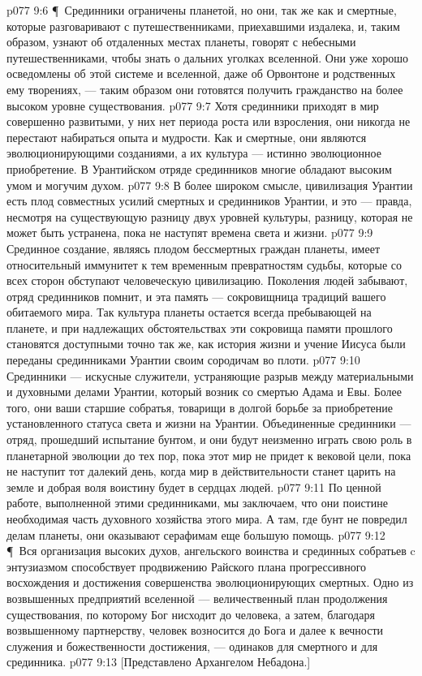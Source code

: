 \vs p077 9:6 \P\ Срединники ограничены планетой, но они, так же как и смертные, которые разговаривают с путешественниками, приехавшими издалека, и, таким образом, узнают об отдаленных местах планеты, говорят с небесными путешественниками, чтобы знать о дальних уголках вселенной. Они уже хорошо осведомлены об этой системе и вселенной, даже об Орвонтоне и родственных ему творениях, --- таким образом они готовятся получить гражданство на более высоком уровне существования.
\vs p077 9:7 Хотя срединники приходят в мир совершенно развитыми, у них нет периода роста или взросления, они никогда не перестают набираться опыта и мудрости. Как и смертные, они являются эволюционирующими созданиями, а их культура --- истинно эволюционное приобретение. В Урантийском отряде срединников многие обладают высоким умом и могучим духом.
\vs p077 9:8 В более широком смысле, цивилизация Урантии есть плод совместных усилий смертных и срединников Урантии, и это --- правда, несмотря на существующую разницу двух уровней культуры, разницу, которая не может быть устранена, пока не наступят времена света и жизни.
\vs p077 9:9 Срединное создание, являясь плодом бессмертных граждан планеты, имеет относительный иммунитет к тем временным превратностям судьбы, которые со всех сторон обступают человеческую цивилизацию. Поколения людей забывают, отряд срединников помнит, и эта память --- сокровищница традиций вашего обитаемого мира. Так культура планеты остается всегда пребывающей на планете, и при надлежащих обстоятельствах эти сокровища памяти прошлого становятся доступными точно так же, как история жизни и учение Иисуса были переданы срединниками Урантии своим сородичам во плоти.
\vs p077 9:10 Срединники --- искусные служители, устраняющие разрыв между материальными и духовными делами Урантии, который возник со смертью Адама и Евы. Более того, они ваши старшие собратья, товарищи в долгой борьбе за приобретение установленного статуса света и жизни на Урантии. Объединенные срединники --- отряд, прошедший испытание бунтом, и они будут неизменно играть свою роль в планетарной эволюции до тех пор, пока этот мир не придет к вековой цели, пока не наступит тот далекий день, когда мир в действительности станет царить на земле и добрая воля воистину будет в сердцах людей.
\vs p077 9:11 По ценной работе, выполненной этими срединниками, мы заключаем, что они поистине необходимая часть духовного хозяйства этого мира. А там, где бунт не повредил делам планеты, они оказывают серафимам еще большую помощь.
\vs p077 9:12 \P\ Вся организация высоких духов, ангельского воинства и срединных собратьев c энтузиазмом способствует продвижению Райского плана прогрессивного восхождения и достижения совершенства эволюционирующих смертных. Одно из возвышенных предприятий вселенной --- величественный план продолжения существования, по которому Бог нисходит до человека, а затем, благодаря возвышенному партнерству, человек возносится до Бога и далее к вечности служения и божественности достижения, --- одинаков для смертного и для срединника.
\vs p077 9:13 [Представлено Архангелом Небадона.]

